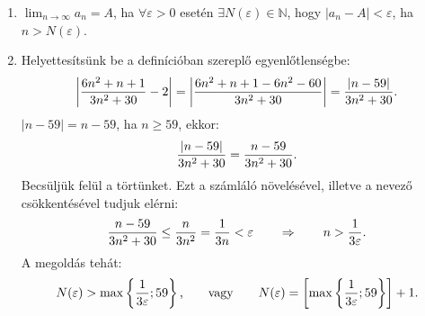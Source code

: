 \documentclass[11pt]{scrartcl}
\begin{document}
\begin{enumerate}
	\item $\displaystyle\lim_{n \to \infty} a_n = A$, ha $\forall\varepsilon > 0$
	      esetén $\exists N(\varepsilon) \in \mathbb{N}$, hogy
	      $|a_n - A| < \varepsilon$, ha $n > N(\varepsilon)$.


	\item Helyettesítsünk be a definícióban szereplő egyenlőtlenségbe:
	      \[
		      \left| \frac{6n^2 + n + 1}{3n^2 + 30} - 2 \right|
		      = \left| \frac{6n^2 + n + 1 - 6n^2 - 60}{3n^2 + 30} \right|
		      = \frac{|n - 59|}{3n^2 + 30}
		      \text.
	      \]
	      $|n - 59| = n - 59$, ha $n \ge 59$, ekkor:
	      \[
		      \frac{|n - 59|}{3n^2 + 30}
		      = \frac{n - 59}{3n^2 + 30}
		      \text.
	      \]
	      Becsüljük felül a törtünket. Ezt a számláló növelésével, illetve a
	      nevező csökkentésével tudjuk elérni:
	      \[
		      \frac{n - 59}{3n^2 + 30}
		      \le \frac{n}{3n^2}
		      = \frac{1}{3n}
		      < \varepsilon
		      \qquad \Rightarrow \qquad
		      n > \frac{1}{3 \varepsilon}
		      \text.
	      \]
	      A megoldás tehát:
	      \[
		      N(\varepsilon) > \max \left\{ \frac{1}{3\varepsilon}; 59 \right\}
		      \text, \qquad \text{vagy} \qquad
		      N(\varepsilon) = \left[
			      \max \left\{ \frac{1}{3\varepsilon}; 59 \right\}
			      \right] + 1
		      \text.
	      \]
\end{enumerate}
\end{document}
